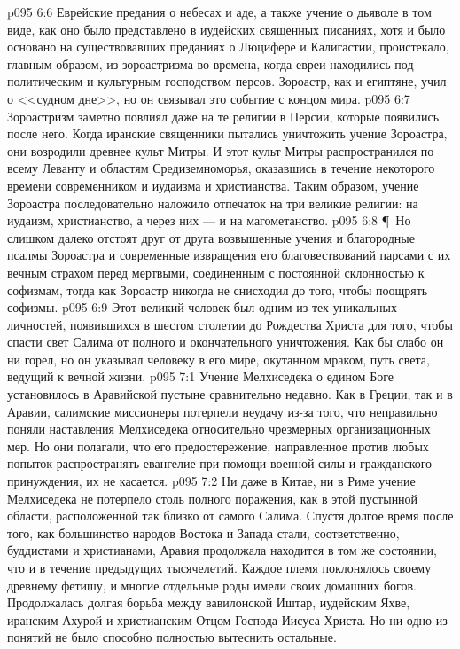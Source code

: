 \vs p095 6:6 Еврейские предания о небесах и аде, а также учение о дьяволе в том виде, как оно было представлено в иудейских священных писаниях, хотя и было основано на существовавших преданиях о Люцифере и Калигастии, проистекало, главным образом, из зороастризма во времена, когда евреи находились под политическим и культурным господством персов. Зороастр, как и египтяне, учил о <<судном дне>>, но он связывал это событие с концом мира.
\vs p095 6:7 Зороастризм заметно повлиял даже на те религии в Персии, которые появились после него. Когда иранские священники пытались уничтожить учение Зороастра, они возродили древнее культ Митры. И этот культ Митры распространился по всему Леванту и областям Средиземноморья, оказавшись в течение некоторого времени современником и иудаизма и христианства. Таким образом, учение Зороастра последовательно наложило отпечаток на три великие религии: на иудаизм, христианство, а через них --- и на магометанство.
\vs p095 6:8 \P\ Но слишком далеко отстоят друг от друга возвышенные учения и благородные псалмы Зороастра и современные извращения его благовествований парсами с их вечным страхом перед мертвыми, соединенным с постоянной склонностью к софизмам, тогда как Зороастр никогда не снисходил до того, чтобы поощрять софизмы.
\vs p095 6:9 Этот великий человек был одним из тех уникальных личностей, появившихся в шестом столетии до Рождества Христа для того, чтобы спасти свет Салима от полного и окончательного уничтожения. Как бы слабо он ни горел, но он указывал человеку в его мире, окутанном мраком, путь света, ведущий к вечной жизни.
\vs p095 7:1 Учение Мелхиседека о едином Боге установилось в Аравийской пустыне сравнительно недавно. Как в Греции, так и в Аравии, салимские миссионеры потерпели неудачу из\hyp{}за того, что неправильно поняли наставления Мелхиседека относительно чрезмерных организационных мер. Но они полагали, что его предостережение, направленное против любых попыток распространять евангелие при помощи военной силы и гражданского принуждения, их не касается.
\vs p095 7:2 Ни даже в Китае, ни в Риме учение Мелхиседека не потерпело столь полного поражения, как в этой пустынной области, расположенной так близко от самого Салима. Спустя долгое время после того, как большинство народов Востока и Запада стали, соответственно, буддистами и христианами, Аравия продолжала находится в том же состоянии, что и в течение предыдущих тысячелетий. Каждое племя поклонялось своему древнему фетишу, и многие отдельные роды имели своих домашних богов. Продолжалась долгая борьба между вавилонской Иштар, иудейским Яхве, иранским Ахурой и христианским Отцом Господа Иисуса Христа. Но ни одно из понятий не было способно полностью вытеснить остальные.
